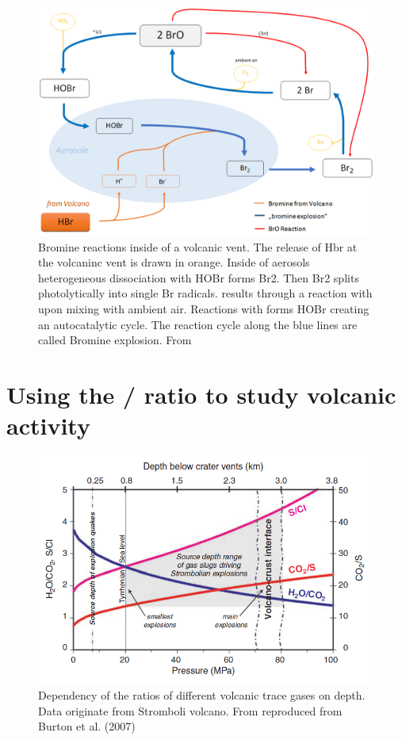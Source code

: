 \documentclass  [
  paper    = a4,
  BCOR     = 10mm,
  twoside,
  fontsize = 12pt,
  fleqn,
  toc      = bibnumbered,
  toc      = listofnumbered,
  numbers  = noendperiod,
  headings = normal,
  listof   = leveldown,
  version  = 3.03
]                                       {scrreprt}
\begin{document}
\begin{figure}
	\centering
	\includegraphics[width=0.7\linewidth]{Bilder/Simon/Bilder_Tung/BrO_Explosion}
	\caption{Bromine reactions inside of a volcanic vent. The release of Hbr at the volcaninc vent is drawn  in orange. Inside of aerosols heterogeneous dissociation with HOBr forms Br2. Then Br2 splits photolytically into single Br radicals.   results through a reaction with  upon mixing with ambient air. Reactions with    forms HOBr creating an autocatalytic cycle. The reaction cycle along the blue lines are called Bromine explosion. From \cite{WarnachSimon}}
	\label{fig:broexplosion}
\end{figure}

\section{Using the /  ratio to study volcanic activity}
\begin{figure}
	\centering
	\includegraphics[width=0.9\linewidth]{Zwischenbericht2018/Bilder/so2_bro}
	\caption{Dependency of the ratios of different volcanic trace gases on depth. Data originate from Stromboli volcano. From \cite{lubcke2014optical} reproduced from Burton et al. (2007)}
	\label{fig:so2bro}
\end{figure}    
	
\end{document}
